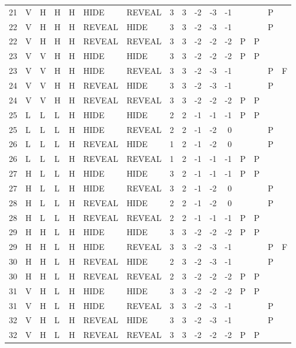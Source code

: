 \begin{longtable}{rllllllrrrrrllll}
  21 & V & H & H & H & HIDE & REVEAL & 3 & 3 & -2 & -3 & -1 &  &  & P &  \\ 
  22 & V & H & H & H & REVEAL & HIDE & 3 & 3 & -2 & -3 & -1 &  &  & P &  \\ 
  22 & V & H & H & H & REVEAL & REVEAL & 3 & 3 & -2 & -2 & -2 & P & P &  &  \\ 
  23 & V & V & H & H & HIDE & HIDE & 3 & 3 & -2 & -2 & -2 & P & P &  &  \\ 
  23 & V & V & H & H & HIDE & REVEAL & 3 & 3 & -2 & -3 & -1 &  &  & P & F \\ 
  24 & V & V & H & H & REVEAL & HIDE & 3 & 3 & -2 & -3 & -1 &  &  & P &  \\ 
  24 & V & V & H & H & REVEAL & REVEAL & 3 & 3 & -2 & -2 & -2 & P & P &  &  \\ 
  25 & L & L & L & H & HIDE & HIDE & 2 & 2 & -1 & -1 & -1 & P & P &  &  \\ 
  25 & L & L & L & H & HIDE & REVEAL & 2 & 2 & -1 & -2 & 0 &  &  & P &  \\ 
  26 & L & L & L & H & REVEAL & HIDE & 1 & 2 & -1 & -2 & 0 &  &  & P &  \\ 
  26 & L & L & L & H & REVEAL & REVEAL & 1 & 2 & -1 & -1 & -1 & P & P &  &  \\ 
  27 & H & L & L & H & HIDE & HIDE & 3 & 2 & -1 & -1 & -1 & P & P &  &  \\ 
  27 & H & L & L & H & HIDE & REVEAL & 3 & 2 & -1 & -2 & 0 &  &  & P &  \\ 
  28 & H & L & L & H & REVEAL & HIDE & 2 & 2 & -1 & -2 & 0 &  &  & P &  \\ 
  28 & H & L & L & H & REVEAL & REVEAL & 2 & 2 & -1 & -1 & -1 & P & P &  &  \\ 
  29 & H & H & L & H & HIDE & HIDE & 3 & 3 & -2 & -2 & -2 & P & P &  &  \\ 
  29 & H & H & L & H & HIDE & REVEAL & 3 & 3 & -2 & -3 & -1 &  &  & P & F \\ 
  30 & H & H & L & H & REVEAL & HIDE & 2 & 3 & -2 & -3 & -1 &  &  & P &  \\ 
  30 & H & H & L & H & REVEAL & REVEAL & 2 & 3 & -2 & -2 & -2 & P & P &  &  \\ 
  31 & V & H & L & H & HIDE & HIDE & 3 & 3 & -2 & -2 & -2 & P & P &  &  \\ 
  31 & V & H & L & H & HIDE & REVEAL & 3 & 3 & -2 & -3 & -1 &  &  & P &  \\ 
  32 & V & H & L & H & REVEAL & HIDE & 3 & 3 & -2 & -3 & -1 &  &  & P &  \\ 
  32 & V & H & L & H & REVEAL & REVEAL & 3 & 3 & -2 & -2 & -2 & P & P &  &  \\ 

\end{longtable}
